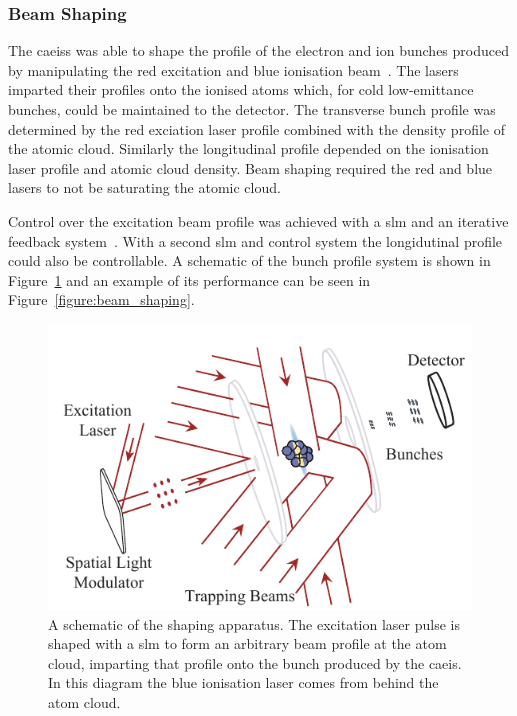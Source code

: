 \subsubsection{Beam Shaping}

The \glspl{caeis} was able to shape the profile of the electron and ion bunches produced by manipulating the red excitation and blue ionisation beam~\cite{mcculloch_arbitrarily_2011}.
The lasers imparted their profiles onto the ionised atoms which, for cold low-emittance bunches, could be maintained to the detector.
The transverse bunch profile was determined by the red exciation laser profile combined with the density profile of the atomic cloud.
Similarly the longitudinal profile depended on the ionisation laser profile and atomic cloud density.
Beam shaping required the red and blue lasers to not be saturating the atomic cloud.

Control over the excitation beam profile was achieved with a \gls{slm} and an iterative feedback system~\cite{van_bijnen_patterned_2015}.
With a second \gls{slm} and control system the longidutinal profile could also be controllable.
A schematic of the bunch profile system is shown in Figure~\ref{figure:beam_shaping_schematic} and an example of its performance can be seen in Figure~\ref{figure:beam_shaping}.

\begin{figure}
    \center
    \includegraphics{part2/Figs/beam_shaping_schem.pdf}
    \caption{A schematic of the shaping apparatus. The excitation laser pulse is shaped with a \gls{slm} to form an arbitrary beam profile at the atom cloud, imparting that profile onto the bunch produced by the \gls{caeis}. In this diagram the blue ionisation laser comes from behind the atom cloud.}
    \label{figure:beam_shaping_schematic}
\end{figure}

